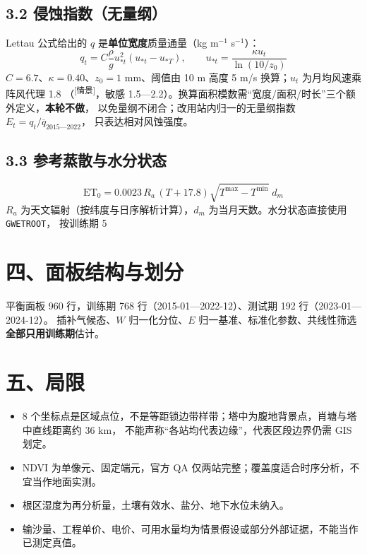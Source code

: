 \documentclass[11pt,a4paper]{ctexart}
\newcommand{\src}[1]{\textsuperscript{\scriptsize [#1]}}
\begin{document}
\subsection*{3.2 侵蚀指数（无量纲）}
Lettau 公式给出的 $q$ 是\textbf{单位宽度}质量通量（kg m$^{-1}$ s$^{-1}$）：
\begin{equation*}
q_t=C\frac{\rho}{g}u_{*t}^2\left(u_{*t}-u_{*T}\right),\qquad
u_{*t}=\frac{\kappa u_t}{\ln(10/z_0)}
\end{equation*}
$C=6.7$、$\kappa=0.40$、$z_0=1$ mm、阈值由 10 m 高度 5 m/s 换算；$u_t$ 为月均风速乘阵风代理 1.8
（\src{情景}，敏感 1.5—2.2）。换算面积模数需“宽度/面积/时长”三个额外定义，\textbf{本轮不做}，
以免量纲不闭合；改用站内归一的无量纲指数 $E_t=q_t/\overline{q}_{2015\text{—}2022}$，
只表达相对风蚀强度。

\subsection*{3.3 参考蒸散与水分状态}
\begin{equation*}
\mathrm{ET}_0=0.0023\,R_a\,(T+17.8)\sqrt{T^{\max}-T^{\min}}\;d_m
\end{equation*}
$R_a$ 为天文辐射（按纬度与日序解析计算），$d_m$ 为当月天数。水分状态直接使用 \texttt{GWETROOT}，
按训练期 5%

\section*{四、面板结构与划分}
平衡面板 960 行，训练期 768 行（2015-01—2022-12）、测试期 192 行（2023-01—2024-12）。
插补气候态、$W$ 归一化分位、$E$ 归一基准、标准化参数、共线性筛选\textbf{全部只用训练期}估计。

\section*{五、局限}
\begin{itemize}
\item 8 个坐标点是区域点位，不是等距锁边带样带；塔中为腹地背景点，肖塘与塔中直线距离约 36 km，
不能声称“各站均代表边缘”，代表区段边界仍需 GIS 划定。
\item NDVI 为单像元、固定端元，官方 QA 仅两站完整；覆盖度适合时序分析，不宜当作地面实测。
\item 根区湿度为再分析量，土壤有效水、盐分、地下水位未纳入。
\item 输沙量、工程单价、电价、可用水量均为情景假设或部分外部证据，不能当作已测定真值。
\end{itemize}
\end{document}
